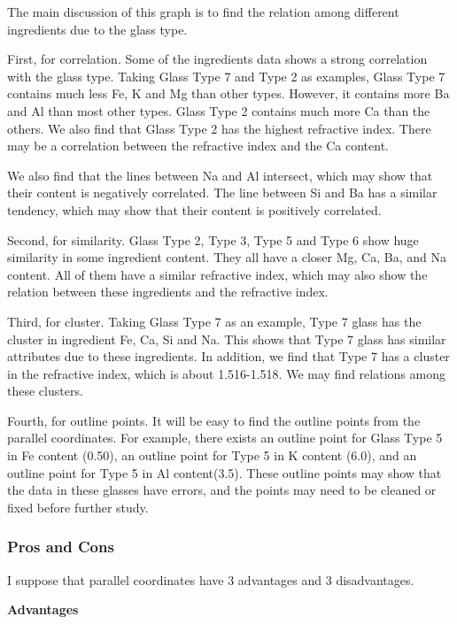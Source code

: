 \documentclass{article}
\begin{document}
\indent 

The main discussion of this graph is to find the relation among different ingredients due to the glass type. 

First, for correlation. Some of the ingredients data shows a strong correlation with the glass type. Taking Glass Type 7 and Type 2 as examples, Glass Type 7 contains much less Fe, K and Mg than other types. However, it contains more Ba and Al than most other types. Glass Type 2 contains much more Ca than the others. We also find that Glass Type 2 has the highest refractive index. There may be a correlation between the refractive index and the Ca content. 

We also find that the lines between Na and Al intersect, which may show that their content is negatively correlated. The line between Si and Ba has a similar tendency, which may show that their content is positively correlated.

Second, for similarity. Glass Type 2, Type 3, Type 5 and Type 6 show huge similarity in some ingredient content. They all have a closer Mg, Ca, Ba, and Na content. All of them have a similar refractive index, which may also show the relation between these ingredients and the refractive index. 

Third, for cluster. Taking Glass Type 7 as an example, Type 7 glass has the cluster in ingredient Fe, Ca, Si and Na. This shows that Type 7 glass has similar attributes due to these ingredients. In addition, we find that Type 7 has a cluster in the refractive index, which is about 1.516-1.518. We may find relations among these clusters. 

Fourth, for outline points. It will be easy to find the outline points from the parallel coordinates. For example, there exists an outline point for Glass Type 5 in Fe content (0.50), an outline point for Type 5 in K content (6.0), and an outline point for Type 5 in Al content(3.5). These outline points may show that the data in these glasses have errors, and the points may need to be cleaned or fixed before further study.

\subsubsection{Pros and Cons}

I suppose that parallel coordinates have 3 advantages and 3 disadvantages.

\bigskip

\noindent\textbf{Advantages}
\end{document}
